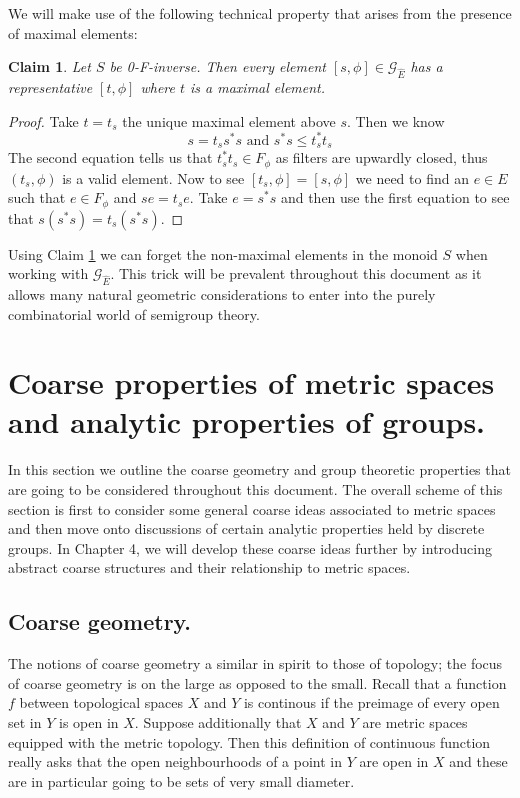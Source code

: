 \documentclass[11pt,]{amsbook}
\theoremstyle{plain}
\newtheorem{claim}[theorem]{Claim}%
\theoremstyle{definition}%
\theoremstyle{remark}%
\newcommand{\G}{\mathcal{G}}
\newcommand{\E}{\widehat{E}}
\begin{document}
We will make use of the following technical property that arises from the presence of maximal elements:

\begin{claim}\label{MainClaim:C1}
Let $S$ be 0-F-inverse. Then every element $[s,\phi] \in \G_{\E}$ has a representative $[t,\phi]$ where $t$ is a maximal element.
\end{claim}
\begin{proof}
Take $t=t_{s}$ the unique maximal element above $s$. Then we know 
\begin{equation*}
s = t_{s}s^{*}s \mbox{ and } s^{*}s \leq t_{s}^{*}t_{s}
\end{equation*} 
The second equation tells us that $t_{s}^{*}t_{s} \in F_{\phi}$ as filters are upwardly closed, thus $(t_{s},\phi)$ is a valid element. Now to see $[t_{s},\phi]=[s,\phi]$ we need to find an $e \in E$ such that $e \in F_{\phi}$ and $se=t_{s}e$. Take $e=s^{*}s$ and then use the first equation to see that $s(s^{*}s)=t_{s}(s^{*}s)$.
\end{proof}
Using Claim \ref{MainClaim:C1} we can forget the non-maximal elements in the monoid $S$ when working with $\G_{\E}$. This trick will be prevalent throughout this document as it allows many natural geometric considerations to enter into the purely combinatorial world of semigroup theory.

\section{Coarse properties of metric spaces and analytic properties of groups.}
In this section we outline the coarse geometry and group theoretic properties that are going to be considered throughout this document. The overall scheme of this section is first to consider some general coarse ideas associated to metric spaces and then move onto discussions of certain analytic properties held by discrete groups. In Chapter 4, we will develop these coarse ideas further by introducing abstract coarse structures and their relationship to metric spaces.

\subsection{Coarse geometry.}
The notions of coarse geometry a similar in spirit to those of topology; the focus of coarse geometry is on the large as opposed to the small. Recall that a function $f$ between topological spaces $X$ and $Y$ is continous if the preimage of every open set in $Y$ is open in $X$. Suppose additionally that $X$ and $Y$ are metric spaces equipped with the metric topology. Then this definition of continuous function really asks that the open neighbourhoods of a point in $Y$ are open in $X$ and these are in particular going to be sets of very small diameter. 
\end{document}
